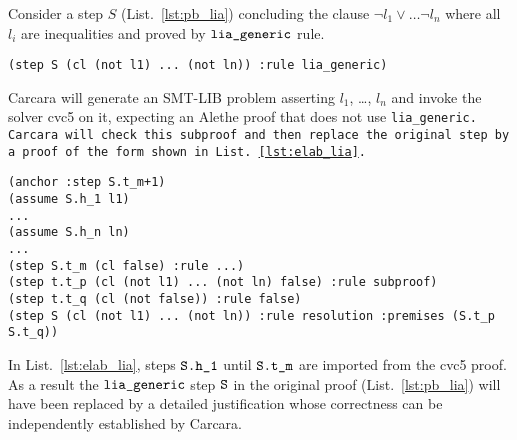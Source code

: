 \begin{example}

Consider a step $S$ (List.~\ref{lst:pb_lia}) concluding the clause $\neg l_1 \lor \dots \neg l_n$ where all $l_i$ are inequalities and proved by $\tt{lia\_generic}$ rule.
    
\begin{lstlisting}[language=SMT,caption={Elaborated proof},label={lst:pb_lia}]
    (step S (cl (not l1) ... (not ln)) :rule lia_generic)
\end{lstlisting}
%
Carcara will generate an SMT-LIB problem asserting $l_1$, \dots, $l_n$ and invoke the solver cvc5 on it, expecting an Alethe proof 
that does not use \tt{lia\_generic}. Carcara will check this subproof and then replace the original step by a proof of the form shown in List.~\ref{lst:elab_lia}.

\begin{lstlisting}[language=SMT,caption={Elaboration of \tt{lia\_generic}},label={lst:elab_lia}]
(anchor :step S.t_m+1)
(assume S.h_1 l1)
...
(assume S.h_n ln)
...
(step S.t_m (cl false) :rule ...)
(step t.t_p (cl (not l1) ... (not ln) false) :rule subproof)
(step t.t_q (cl (not false)) :rule false)
(step S (cl (not l1) ... (not ln)) :rule resolution :premises (S.t_p S.t_q))
\end{lstlisting}

In List.~\ref{lst:elab_lia}, steps $\tt{S.h\_1}$ until $\tt{S.t\_m}$ are imported from the cvc5 proof.
As a result the $\tt{lia\_generic}$ step $\tt{S}$ in the original proof (List.~\ref{lst:pb_lia}) will have been replaced by a detailed justification whose correctness can be independently established by Carcara.

\end{example}
